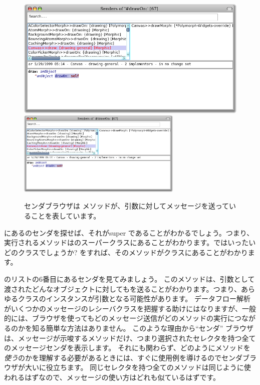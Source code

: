 \documentclass[a4paper,10pt,twoside]{book}
\begin{document}
\begin{figure}[htbp]
\begin{center}
   \ifluluelse
{\includegraphics[width=\textwidth]{CanvasDraw}}
{\includegraphics[width=0.7\textwidth]{CanvasDraw}}
\end{center}
\caption{センダブラウザは メソッドが、引数に対してメッセージを送っていることを表しています。}
\end{figure}

にあるのセンダを探せば、それがsuper であることがわかるでしょう。つまり、実行されるメソッドはのスーパークラスにあることがわかります。ではいったいどのクラスでしょうか? を\actclick すれば、そのメソッドがクラスにあることがわかります。

のリストの6番目にあるセンダを見てみましょう。
このメソッドは、引数として渡されたどんなオブジェクトに対してもを送ることがわかります。つまり、あらゆるクラスのインスタンスが引数となる可能性があります。
データフロー解析がいくつかのメッセージのレシーバクラスを把握する助けにはなりますが、一般的には、ブラウザを使ってもどのメッセージ送信がどのメソッドの実行につながるのかを知る簡単な方法はありません。
このような理由から``センダ'' ブラウザは、メッセージが示唆するメソッドだけ、つまり選択されたセレクタを持つ全てのメッセージセンダを表示します。
それにも関わらず、どのようにメソッドを\emph{使う}のかを理解する必要があるときには、すぐに使用例を導けるのでセンダブラウザが大いに役立ちます。
同じセレクタを持つ全てのメソッドは同じように使われるはずなので、メッセージの使い方はどれも似ているはずです。
\end{document}
